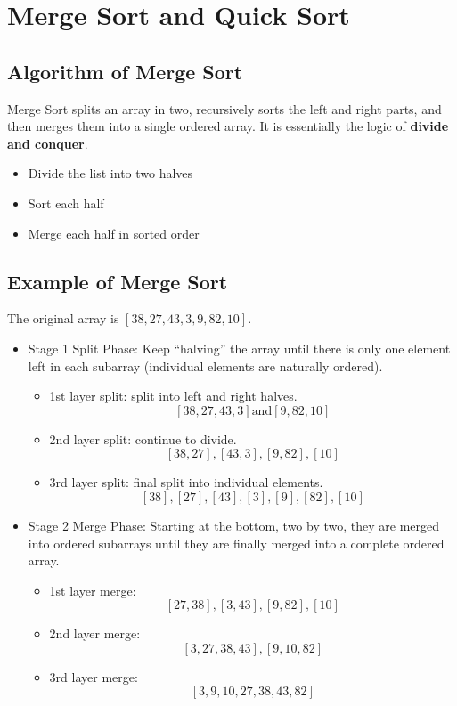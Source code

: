 \documentclass[letterpaper,12pt]{article}
\begin{document}
\section{Merge Sort and Quick Sort}
\subsection{Algorithm of Merge Sort}
Merge Sort splits an array in two, recursively sorts the left and right parts, and then merges them into a single ordered array. It is essentially the logic of \textbf{divide and conquer}.
\begin{itemize}
    \item Divide the list into two halves
    \item Sort each half
    \item Merge each half in sorted order
\end{itemize}
\subsection{Example of Merge Sort}
The original array is $[38,27,43,3,9,82,10]$.
\begin{itemize}
    \item Stage 1 Split Phase: Keep “halving” the array until there is only one element left in each subarray (individual elements are naturally ordered).
    \begin{itemize}
        \item 1st layer split: split into left and right halves.
        $$[38,27,43,3] \text{and} [9,82,10]$$
        \item 2nd layer split: continue to divide.
        $$[38,27], [43,3], [9,82], [10]$$
        \item 3rd layer split: final split into individual elements.
        $$[38],[27],[43],[3],[9],[82],[10]$$
    \end{itemize}
    \item Stage 2 Merge Phase: Starting at the bottom, two by two, they are merged into ordered subarrays until they are finally merged into a complete ordered array.
    \begin{itemize}
        \item 1st layer merge:
        $$[27,38], [3,43], [9,82], [10]$$
        \item 2nd layer merge:
        $$[3,27,38,43], [9,10,82]$$
        \item 3rd layer merge:
        $$[3,9,10,27,38,43,82]$$
    \end{itemize}
\end{itemize}
\end{document}
